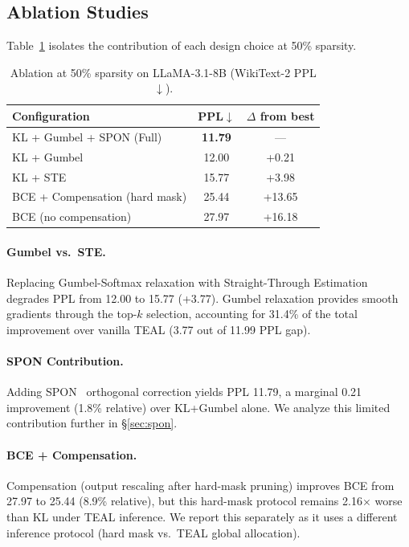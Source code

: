 \subsection{Ablation Studies}

Table~\ref{tab:ablation} isolates the contribution of each design choice at 50\% sparsity.

\begin{table}[t]
\centering
\caption{Ablation at 50\% sparsity on LLaMA-3.1-8B (WikiText-2 PPL$\downarrow$).}
\label{tab:ablation}
\small
\begin{tabular}{lcc}
\toprule
Configuration & PPL$\downarrow$ & $\Delta$ from best \\
\midrule
KL + Gumbel + SPON (Full) & \textbf{11.79} & --- \\ %
KL + Gumbel & 12.00 & +0.21 \\ %
KL + STE & 15.77 & +3.98 \\ %
BCE + Compensation (hard mask) & 25.44 & +13.65 \\ %
BCE (no compensation) & 27.97 & +16.18 \\ %
\bottomrule
\end{tabular}
\end{table}

\paragraph{Gumbel vs.\ STE.}
Replacing Gumbel-Softmax relaxation with Straight-Through Estimation~\cite{bengio2013ste} degrades PPL from 12.00 to 15.77 (+3.77). %
Gumbel relaxation provides smooth gradients through the top-$k$ selection, accounting for 31.4\% of the total improvement over vanilla TEAL (3.77 out of 11.99 PPL gap).

\paragraph{SPON Contribution.}
Adding SPON~\cite{xu2026spon} orthogonal correction yields PPL 11.79, a marginal 0.21 improvement (1.8\% relative) over KL+Gumbel alone. %
We analyze this limited contribution further in \S\ref{sec:spon}.

\paragraph{BCE + Compensation.}
Compensation (output rescaling after hard-mask pruning) improves BCE from 27.97 to 25.44 (8.9\% relative), but this hard-mask protocol remains 2.16$\times$ worse than KL under TEAL inference. %
We report this separately as it uses a different inference protocol (hard mask vs.\ TEAL global allocation).


